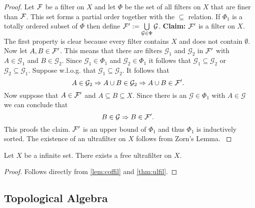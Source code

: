 \begin{proof}
  Let $\mathcal{F}$ be a filter on $X$ and let $\Phi$ be the set of all filters on $X$ that are finer than $\mathcal{F}$. This set forms a partial order together with the $\subseteq$ relation.
  If $\Phi_1$ is a totally ordered subset of $\Phi$ then define $\mathcal{F}' := \bigcup\limits_{\mathcal{G} \in \Phi} \mathcal{G}$.
  \textbf{Claim: } $\mathcal{F}'$ is a filter on $X$. The first property is clear because every filter contains $X$ and does not contain $\emptyset$.
  Now let $A, B \in \mathcal{F}'$. This means that there are filters $\mathcal{G}_1$ and $\mathcal{G}_2$ in $\mathcal{F}'$ with $A \in \mathcal{G}_1$ and $B \in \mathcal{G}_2$.
  Since $\mathcal{G}_1 \in \Phi_1$ and $\mathcal{G}_2 \in \Phi_1$ it follows that $\mathcal{G}_1 \subseteq \mathcal{G}_2$ or $\mathcal{G}_2 \subseteq \mathcal{G}_1$. Suppose w.l.o.g. that $\mathcal{G}_1 \subseteq \mathcal{G}_2$.
  It follows that
  \begin{equation*}
    A \in \mathcal{G}_2 \Rightarrow A \cup B \in \mathcal{G}_2 \Rightarrow A \cup B \in \mathcal{F}'.
  \end{equation*}
  Now suppose that $A \in \mathcal{F}'$ and $A \subseteq B \subseteq X$. Since there is an $\mathcal{G} \in \Phi_1$ with $A \in \mathcal{G}$ we can conclude that
  \begin{equation*}
    B \in \mathcal{G} \Rightarrow B \in \mathcal{F}'.
  \end{equation*}
  This proofs the claim. $\mathcal{F}'$ is an upper bound of $\Phi_1$ and thus $\Phi_1$ is inductively sorted. The existence of an ultrafilter on $X$ follows from Zorn's Lemma. \cite[5.12 Satz]{BvQMT}
\end{proof}

\begin{col}\label{col:exfreeuf}
  Let $X$ be a infinite set. There exists a free ultrafilter on $X$.
\end{col}

\begin{proof}
  Follows directly from \ref{lem:coffil} and \ref{thm:ulfil}.
\end{proof}

\subsection{Topological Algebra}

